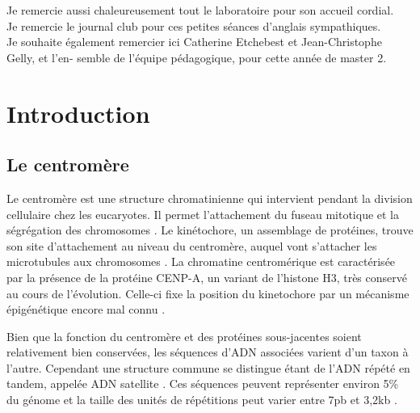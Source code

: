 \documentclass[12pt,a4paper]{article}
\begin{document}
Je remercie aussi chaleureusement tout le laboratoire pour son accueil cordial.\\

Je remercie le journal club pour ces petites séances d'anglais sympathiques.\\

Je souhaite également remercier ici Catherine Etchebest et Jean-Christophe Gelly, et l’en-
semble de l’équipe pédagogique, pour cette année de master 2.\\

\thispagestyle{empty}

\newpage
\tableofcontents
\setcounter{page}{0}
\thispagestyle{empty}
\newpage 

\section{Introduction}
\subsection{Le centromère}
Le centromère est une structure chromatinienne qui intervient pendant la division cellulaire chez les eucaryotes. Il permet l'attachement du fuseau mitotique et la ségrégation des chromosomes \cite{Cleveland2003}.  Le kinétochore, un assemblage de protéines, trouve son site d'attachement au niveau du centromère, auquel vont s'attacher les  microtubules aux chromosomes \cite{Santaguida2009}. La chromatine centromérique est caractérisée par la présence de la protéine CENP-A, un variant de l'histone H3, très conservé au cours de l'évolution. Celle-ci fixe la position du kinetochore par un mécanisme épigénétique encore mal connu \cite{Sullivan1994}.

Bien que la fonction du centromère et des protéines sous-jacentes soient relativement bien conservées, les séquences d'ADN associées varient d'un taxon à l'autre. Cependant une structure commune se distingue étant de l'ADN répété en tandem, appelée ADN satellite \cite{Henikoff2001}. Ces séquences peuvent représenter environ 5\% du génome et la taille des unités de répétitions peut varier entre 7pb et 3,2kb \cite{Cellamare2009}.
\end{document}
